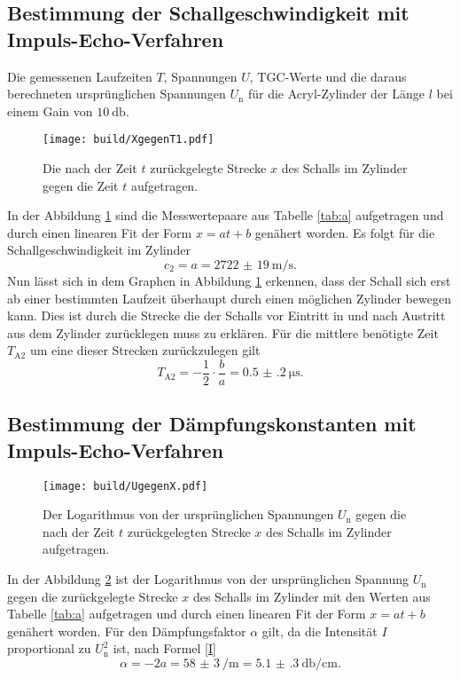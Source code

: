 \subsection{Bestimmung der Schallgeschwindigkeit mit Impuls-Echo-Verfahren}
\begin{table}
	\centering
	\caption{Die gemessenen Laufzeiten $T$, Spannungen $U$, TGC-Werte und die daraus berechneten ursprünglichen Spannungen $U_\text{n}$ für die Acryl-Zylinder der Länge $l$ bei einem Gain von $\SI{10}{\decibel}$.}
	
\end{table}
\begin{figure}
	\centering
	\caption{Die nach der Zeit $t$ zurückgelegte Strecke $x$ des Schalls im Zylinder gegen die Zeit $t$ aufgetragen.}
	\texttt{[image: build/XgegenT1.pdf]}
	\label{fig:XgegenT1}
\end{figure}
In der Abbildung \ref{fig:XgegenT1} sind die Messwertepaare aus Tabelle \ref{tab:a} aufgetragen und durch einen linearen Fit der Form $x=a t + b$ genähert worden.
Es folgt für die Schallgeschwindigkeit im Zylinder
\begin{equation}
	c_2=a=\SI{2722(19)}{\meter\per\second}\text{.}
\end{equation}
Nun lässt sich in dem Graphen in Abbildung \ref{fig:XgegenT1} erkennen, dass der Schall sich erst ab einer bestimmten Laufzeit überhaupt durch einen möglichen Zylinder bewegen kann. Dies ist durch die Strecke die der Schalls vor Eintritt in und nach Austritt aus dem Zylinder zurücklegen muss zu erklären. Für die mittlere benötigte Zeit $T_{\text{A}2}$ um eine dieser Strecken zurückzulegen gilt 
\begin{equation}
	T_{\text{A}2}=-\frac{1}{2} \cdot \frac{b}{a}=\SI{0.5(2)}{\micro\second}\text{.}
\end{equation}

\subsection{Bestimmung der Dämpfungskonstanten mit Impuls-Echo-Verfahren}
\begin{figure}
	\centering
	\caption{Der Logarithmus von der ursprünglichen Spannungen $U_\text{n}$ gegen die nach der Zeit $t$ zurückgelegten Strecke $x$ des Schalls im Zylinder aufgetragen.}
	\texttt{[image: build/UgegenX.pdf]}
	\label{fig:UgegenX}
\end{figure}
In der Abbildung \ref{fig:UgegenX} ist der Logarithmus von der ursprünglichen Spannung $U_\text{n}$ gegen die zurückgelegte Strecke $x$ des Schalls im Zylinder mit den Werten aus Tabelle \ref{tab:a} aufgetragen und durch einen linearen Fit der Form $x=a t + b$ genähert worden. Für den Dämpfungsfaktor $\alpha$ gilt, da die Intensität $I$ proportional zu $U_\text{n}^2$ ist, nach Formel \eqref{I}
\begin{equation}
	\alpha=-2 a = \SI{58(3)}{\per\meter}=\SI{5.1(3)}{\decibel\per\centi\meter}\text{.}
\end{equation}



